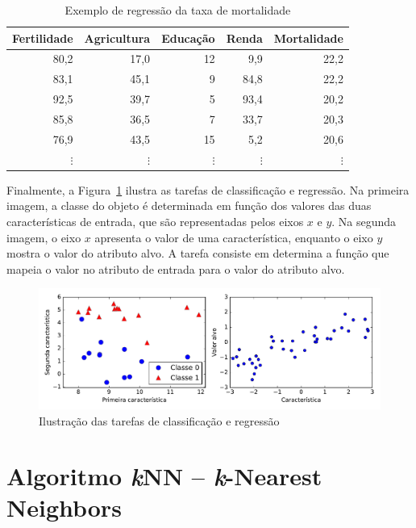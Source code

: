 \begin{table}[h]
	\centering
	
	\begin{tabular}{rrrrr}
		\hline
		\textbf{Fertilidade} & \textbf{Agricultura} & \textbf{Educação} & \textbf{Renda} & \textbf{Mortalidade} \\
		\hline
		80,2 & 17,0 & 12 & 9,9 & 22,2\\
		83,1 & 45,1 & 9 & 84,8 & 22,2\\
		92,5 & 39,7 & 5 & 93,4 & 20,2\\
		85,8 & 36,5 & 7 & 33,7 & 20,3\\
		76,9 & 43,5 & 15 & 5,2 & 20,6\\
		$\vdots$ & $\vdots$ & $\vdots$ & $\vdots$ & $\vdots$ \\
		\hline
	\end{tabular}
	
	\caption{Exemplo de regressão da taxa de mortalidade}
	\label{tab:exemplo-regressao}
\end{table}

Finalmente, a Figura~\ref{fig:exemplo-classificacao-regressao} ilustra as tarefas de classificação e regressão. Na primeira imagem, a classe do objeto é determinada em função dos valores das duas características de entrada, que são representadas pelos eixos $x$ e $y$. Na segunda imagem, o eixo $x$ apresenta o valor de uma característica, enquanto o eixo $y$ mostra o valor do atributo alvo. A tarefa consiste em determina a função que mapeia o valor no atributo de entrada para o valor do atributo alvo.

\begin{figure}[h]
	\centering
	\includegraphics[width=\textwidth]{img/exemplo-classificacao-regressao}
	\caption{Ilustração das tarefas de classificação e regressão}
	\label{fig:exemplo-classificacao-regressao}
\end{figure}

\section{Algoritmo \textit{k}NN -- \textit{k}-Nearest Neighbors}

